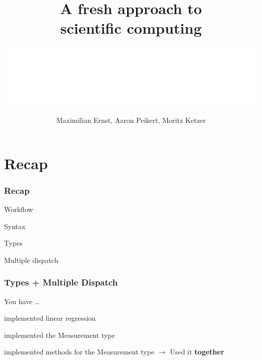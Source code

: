\documentclass[notes]{beamer}
\title{\Huge A fresh approach to \\ scientific computing}
\date{Maximilian Ernst, Aaron Peikert, Moritz Ketzer}
\author{\includegraphics[width=.49\textwidth]{figures/mpib_logo/MPIB_Logo_EN_horizontal_RGB_White.png}}
\def\\{}%
\newenvironment{wideitemize}{
    \itemize\addtolength{\itemsep}{15pt}\addtolength{\topsep}{10pt}}{\enditemize}
\begin{document}
	\setcounter{showProgressBar}{0}
	\setcounter{showSlideNumbers}{0}

	{
    }

    {
	\frame{
	\titlepage}
	}

	\setcounter{showProgressBar}{0}
	\setcounter{showSlideNumbers}{0}

	\section{Recap}

    \begin{frame}
    \frametitle{Recap}
        \begin{wideitemize}
            \item Workflow
            \item Syntax
            \item Types
            \item Multiple dispatch
        \end{wideitemize}
    \end{frame}

    \begin{frame}
    \frametitle{Types + Multiple Dispatch}
    You have \ldots
    \vspace{1cm}
        \begin{wideitemize}
            \item implemented linear regression
            \item implemented the Measurement type
            \item implemented methods for the Measurement type
        \end{wideitemize}
    \vspace{1cm}
    $\rightarrow$ Used it \textbf{together}\\
    \end{frame}
\end{document}
